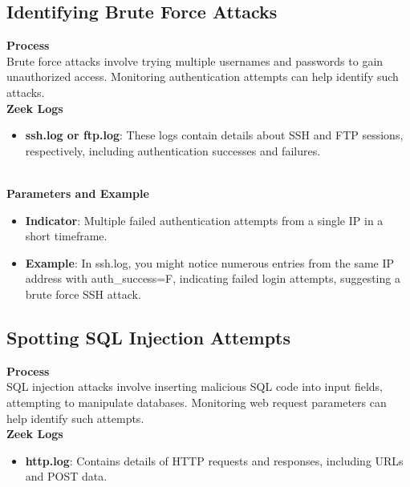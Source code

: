 \vspace{8pt}
\subsection{Identifying Brute Force Attacks}
\textbf{Process}
\vspace{8pt}
\\
Brute force attacks involve trying multiple usernames and passwords to gain unauthorized access. Monitoring authentication attempts can help identify such attacks.
\vspace{10pt}
\\

\noindent \textbf{Zeek Logs}
\begin{itemize}
    \item \textbf{ssh.log or ftp.log}: These logs contain details about SSH and FTP sessions, respectively, including authentication successes and failures.
\end{itemize}
\vspace{10pt}
\\

\noindent \textbf{Parameters and Example}
\begin{itemize}
    \item \textbf{Indicator}: Multiple failed authentication attempts from a single IP in a short timeframe.
    \item \textbf{Example}: In ssh.log, you might notice numerous entries from the same IP address with auth\_success=F, indicating failed login attempts, suggesting a brute force SSH attack.
\end{itemize}

\vspace{8pt}
\subsection{Spotting SQL Injection Attempts}
\textbf{Process}
\vspace{8pt}
\\
SQL injection attacks involve inserting malicious SQL code into input fields, attempting to manipulate databases. Monitoring web request parameters can help identify such attempts.
\vspace{10pt}
\\

\noindent \textbf{Zeek Logs}
\begin{itemize}
    \item \textbf{http.log}: Contains details of HTTP requests and responses, including URLs and POST data.
\end{itemize}
\vspace{10pt}
\\

